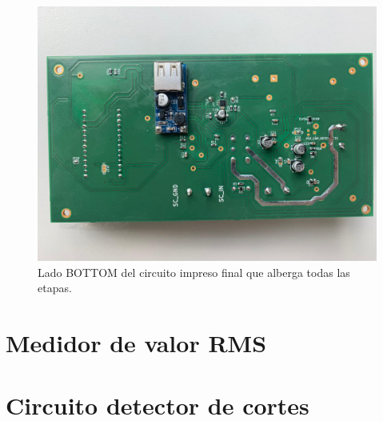 \begin{figure}[h!]
	\centering
	\includegraphics[width=0.8\linewidth]{Figures/pcb_fina_bottom}
	\caption{Lado BOTTOM del circuito impreso final que alberga todas las etapas.}
	\label{fig:pcbfinabottom}
\end{figure}


\section{Medidor de valor RMS}\label{ensayo_medidor_rms}


\section{Circuito detector de cortes}

